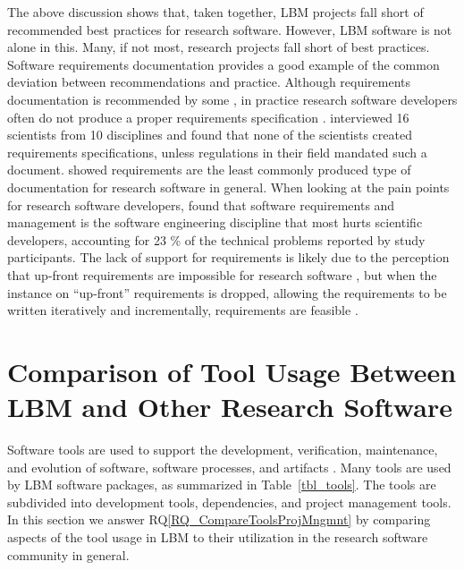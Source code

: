 \documentclass[final, 3p, times, authoryear]{elsarticle}
\newcommand{\rqref}[1]{RQ\ref{#1}}
\begin{document}
The above discussion shows that, taken together, LBM projects fall short of
recommended best practices for research software.  However, LBM software is not
alone in this.  Many, if not most, research projects fall short of best
practices.  Software requirements documentation provides a good example of the
common deviation between recommendations and practice.  Although requirements
documentation is recommended by some \citep{TobiasEtAl2018, HerouxEtAl2008,
SmithAndKoothoor2016}, in practice research software developers often do not
produce a proper requirements specification \citep{HeatonAndCarver2015}.
\citet{SandersAndKelly2008} interviewed 16 scientists from 10 disciplines and
found that none of the scientists created requirements specifications, unless
regulations in their field mandated such a document. \citet{Nguyen-HoanEtAl2010}
showed requirements are the least commonly produced type of documentation for
research software in general. When looking at the pain points for research
software developers, \citet{WieseEtAl2019} found that software requirements and
management is the software engineering discipline that most hurts scientific
developers, accounting for 23 \% of the technical problems reported by study
participants.  The lack of support for requirements is likely due to the
perception that up-front requirements are impossible for research software
\citep{CarverEtAl2007,SegalAndMorris2008}, but when the instance on ``up-front''
requirements is dropped, allowing the requirements to be written iteratively and
incrementally, requirements are feasible \citep{Smith2016}.

\section{Comparison of Tool Usage Between LBM and Other Research Software}
\label{Sec_CompareTools}

Software tools are used to support the development, verification, maintenance,
and evolution of software, software processes, and artifacts \citep[p.\
501]{GhezziEtAl2003}. Many tools are used by LBM software packages, as
summarized in Table~\ref{tbl_tools}.  The tools are subdivided into development
tools, dependencies, and project management tools.  In this section we answer
\rqref{RQ_CompareToolsProjMngmnt} by comparing aspects of the tool usage in LBM
to their utilization in the research software community in general.
\end{document}

